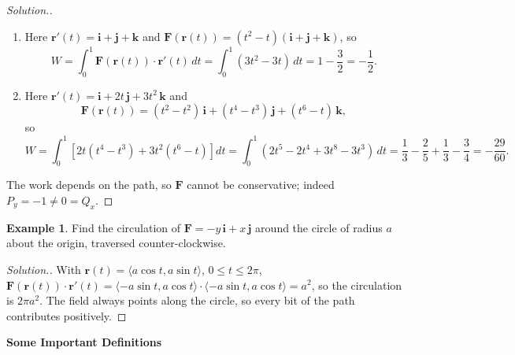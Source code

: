 \documentclass[11pt,a4paper]{article}
\theoremstyle{definition}
\newtheorem{exa}[thm]{Example}
\newenvironment{solution}
  {\renewcommand{\qedsymbol}{}\begin{proof}[\textit{Solution}.]}
  {\end{proof}}
\newcommand{\subhead}[1]{%
  \par\medskip\noindent\textbf{#1}\par\nobreak\smallskip}
\begin{document}
\begin{solution}
\begin{enumerate}
\item Here $\mathbf r'(t) = \mathbf i + \mathbf j + \mathbf k$ and
$\mathbf F(\mathbf r(t)) = (t^2 - t)(\mathbf i + \mathbf j + \mathbf k)$, so
\[W = \int^1_0 \mathbf F(\mathbf r(t))\cdot\mathbf r'(t)\,dt = \int_0^1 (3t^2 -
3t)\,dt = 1 - \frac32 = -\frac{1}{2} .\]

\item Here $\mathbf r'(t) = \mathbf i + 2t\,\mathbf j + 3t^2\,\mathbf k$ and
\[\mathbf F(\mathbf r(t)) = (t^2 -t^2)\,\mathbf i + (t^4 - t^3)\,\mathbf j + (t^6
-t)\,\mathbf k ,\]
so
\[W = \int^1_0 \left[2t(t^4-t^3) + 3t^2(t^6-t)\right]dt = \int^1_0 ( 2t^5 - 2t^4
+ 3t^8 - 3t^3) \,dt = \frac13 - \frac25 + \frac13 - \frac34 = -\frac{29}{60} .\]
\end{enumerate}
The work depends on the path, so $\mathbf F$ cannot be conservative; indeed
$P_y = -1\neq 0 = Q_x$.
\end{solution}

\begin{exa}
\label{ex:circulation}
Find the circulation of $\mathbf F = -y\,\mathbf i + x\,\mathbf j$ around the
circle of radius $a$ about the origin, traversed counter-clockwise.
\end{exa}

\begin{solution}
With $\mathbf r(t) = \langle a\cos t, a\sin t\rangle$, $0\leq t\leq 2\pi$,
$\mathbf F(\mathbf r(t))\cdot\mathbf r'(t) = \langle -a\sin t, a\cos
t\rangle\cdot\langle -a\sin t, a\cos t\rangle = a^2$, so the circulation is
$2\pi a^2$. The field always points along the circle, so every bit of the path
contributes positively.
\end{solution}

\subhead{Some Important Definitions}
\end{document}
